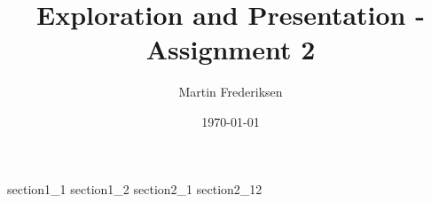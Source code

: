 \documentclass[10pt]{article}
\title{Exploration and Presentation - Assignment 2}
\author{Martin Frederiksen}
\date{\today}
\begin{document}
\hypersetup{pageanchor=false}
\begin{titlepage}
\maketitle
\end{titlepage}

{section1_1}
{section1_2}
{section2_1}
{section2_12}



\end{document}
